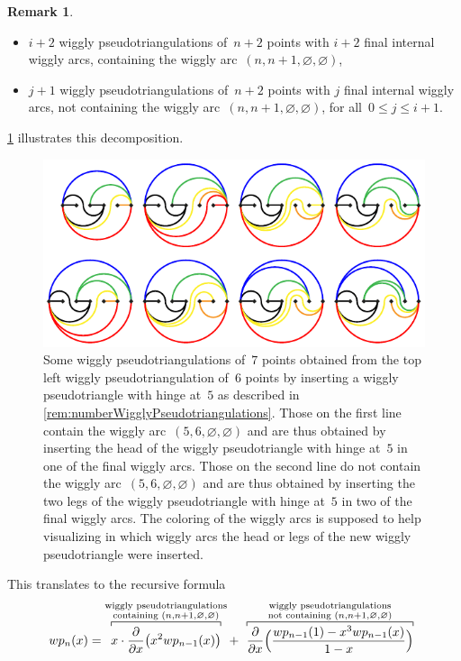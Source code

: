 \documentclass{amsart}
\theoremstyle{definition}
\newtheorem{remark}[theorem]{Remark}
\begin{document}
\begin{remark}
\begin{itemize}
\item $i+2$ wiggly pseudotriangulations of~$n+2$ points with $i+2$ final internal wiggly arcs, containing the wiggly arc~$(n, n+1, \varnothing, \varnothing)$,
\item $j+1$ wiggly pseudotriangulations of~$n+2$ points with $j$ final internal wiggly arcs, not containing the wiggly arc~$(n, n+1, \varnothing, \varnothing)$,  for all~$0 \le j \le i+1$.
\end{itemize}
\pagebreak
\cref{fig:pseudotriangulationsCounting} illustrates this decomposition.
%
\begin{figure}
\centerline{\includegraphics[scale=1.3]{pseudotriangulationCounting}}
\caption{Some wiggly pseudotriangulations of~$7$ points obtained from the top left wiggly pseudotriangulation of~$6$ points by inserting a wiggly pseudotriangle with hinge at~$5$ as described in \cref{rem:numberWigglyPseudotriangulations}. Those on the first line contain the wiggly arc~$(5, 6, \varnothing, \varnothing)$ and are thus obtained by inserting the head of the wiggly pseudotriangle with hinge at~$5$ in one of the final wiggly arcs. Those on the second line do not contain the wiggly arc~$(5, 6, \varnothing, \varnothing)$ and are thus obtained by inserting the two legs of the wiggly pseudotriangle with hinge at~$5$ in two of the final wiggly arcs. The coloring of the wiggly arcs is supposed to help visualizing in which wiggly arcs the head or legs of the new wiggly pseudotriangle were inserted.}
\label{fig:pseudotriangulationsCounting}
\end{figure}
%
This translates to the recursive formula %
\begin{align*}
wp_{n}(x) & = \overbracket[.5pt]{x \cdot \frac{\partial}{\partial x} \big( x^2 wp_{n-1}(x) \big)}^{\substack{\text{wiggly pseudotriangulations} \\ \text{containing } (n, n+1, \varnothing, \varnothing)}} + \overbracket[.5pt]{\frac{\partial}{\partial x}\Big( \smash{\frac{wp_{n-1}(1)-x^3wp_{n-1}(x)}{1-x}} \Big)}^{\substack{\qquad\; \text{wiggly pseudotriangulations} \qquad\;  \\ \text{not containing } (n, n+1, \varnothing, \varnothing)}} \\

\end{align*}
\end{remark}
\end{document}
